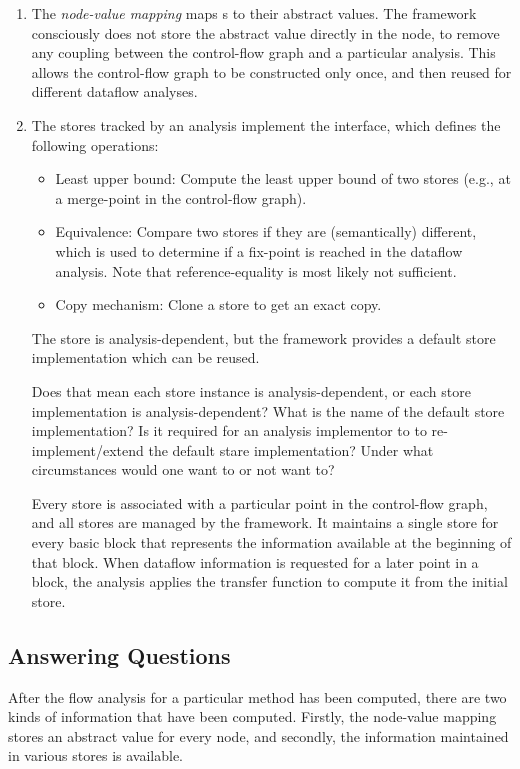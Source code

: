\begin{enumerate}
\item
The
\emph{node-value mapping} maps s to their abstract values.
The framework consciously does not store the abstract value directly in
the node, to remove any coupling between the control-flow graph and a particular analysis.
This allows the control-flow graph to be constructed only once, and then reused for different
dataflow analyses.

\item
The stores tracked by an analysis implement the  interface, which defines the
following operations:
\begin{itemize}
\item Least upper bound: Compute the least upper bound of two stores (e.g., at a merge-point
in the control-flow graph).
\item Equivalence: Compare two stores if they are (semantically) different, which is used
to determine if a fix-point is reached in the dataflow analysis. Note that reference-equality
is most likely not sufficient.
\item Copy mechanism: Clone a store to get an exact copy.
\end{itemize}
The store is analysis-dependent, but the framework provides a default store implementation
which can be reused.

\begin{workinprogress}
Does that mean each store instance is analysis-dependent, or each store
implementation is analysis-dependent?
What is the name of the default store implementation?
Is it required for an analysis implementor to to re-implement/extend the
default stare implementation?  Under what circumstances would one want to
or not want to?
\end{workinprogress}


Every store is associated with a particular point in the control-flow graph, and
all stores are managed by the framework. It maintains
a single store for every basic block that represents the information available at the
beginning of that block.  When dataflow information is requested for a later point in a block, the analysis applies the transfer function to compute it from the initial store.

\end{enumerate}


\subsection{Answering Questions}
After the flow analysis for a particular method has been computed, there are two kinds of
information that have been computed.  Firstly, the node-value mapping stores an abstract
value for every node, and secondly, the information maintained in various stores is
available.

